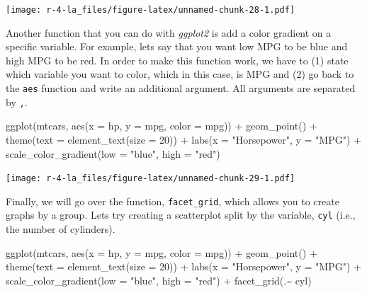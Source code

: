 \documentclass[
]{book}
\newenvironment{Shaded}{\begin{snugshade}}{\end{snugshade}}
\newcommand{\AttributeTok}[1]{\textcolor[rgb]{0.77,0.63,0.00}{#1}}
\newcommand{\DecValTok}[1]{\textcolor[rgb]{0.00,0.00,0.81}{#1}}
\newcommand{\FunctionTok}[1]{\textcolor[rgb]{0.00,0.00,0.00}{#1}}
\newcommand{\NormalTok}[1]{#1}
\newcommand{\SpecialCharTok}[1]{\textcolor[rgb]{0.00,0.00,0.00}{#1}}
\newcommand{\StringTok}[1]{\textcolor[rgb]{0.31,0.60,0.02}{#1}}
\begin{document}
\texttt{[image: r-4-la\_files/figure-latex/unnamed-chunk-28-1.pdf]}

Another function that you can do with \emph{ggplot2} is add a color gradient on a specific variable. For example, lets say that you want low MPG to be blue and high MPG to be red. In order to make this function work, we have to (1) state which variable you want to color, which in this case, is MPG and (2) go back to the \texttt{aes} function and write an additional argument. All arguments are separated by \texttt{,}.

\begin{Shaded}
\begin{Highlighting}[]
\FunctionTok{ggplot}\NormalTok{(mtcars, }\FunctionTok{aes}\NormalTok{(}\AttributeTok{x =}\NormalTok{ hp, }\AttributeTok{y =}\NormalTok{ mpg, }\AttributeTok{color =}\NormalTok{ mpg)) }\SpecialCharTok{+} 
      \FunctionTok{geom\_point}\NormalTok{() }\SpecialCharTok{+} 
      \FunctionTok{theme}\NormalTok{(}\AttributeTok{text =} \FunctionTok{element\_text}\NormalTok{(}\AttributeTok{size =} \DecValTok{20}\NormalTok{)) }\SpecialCharTok{+} 
      \FunctionTok{labs}\NormalTok{(}\AttributeTok{x =} \StringTok{"Horsepower"}\NormalTok{, }\AttributeTok{y =} \StringTok{"MPG"}\NormalTok{) }\SpecialCharTok{+} 
      \FunctionTok{scale\_color\_gradient}\NormalTok{(}\AttributeTok{low =} \StringTok{"blue"}\NormalTok{, }\AttributeTok{high =} \StringTok{"red"}\NormalTok{)}
\end{Highlighting}
\end{Shaded}

\texttt{[image: r-4-la\_files/figure-latex/unnamed-chunk-29-1.pdf]}

Finally, we will go over the function, \texttt{facet\_grid}, which allows you to create graphs by a group. Lets try creating a scatterplot split by the variable, \texttt{cyl} (i.e., the number of cylinders).

\begin{Shaded}
\begin{Highlighting}[]
\FunctionTok{ggplot}\NormalTok{(mtcars, }\FunctionTok{aes}\NormalTok{(}\AttributeTok{x =}\NormalTok{ hp, }\AttributeTok{y =}\NormalTok{ mpg, }\AttributeTok{color =}\NormalTok{ mpg)) }\SpecialCharTok{+} 
      \FunctionTok{geom\_point}\NormalTok{() }\SpecialCharTok{+} 
      \FunctionTok{theme}\NormalTok{(}\AttributeTok{text =} \FunctionTok{element\_text}\NormalTok{(}\AttributeTok{size =} \DecValTok{20}\NormalTok{)) }\SpecialCharTok{+} 
      \FunctionTok{labs}\NormalTok{(}\AttributeTok{x =} \StringTok{"Horsepower"}\NormalTok{, }\AttributeTok{y =} \StringTok{"MPG"}\NormalTok{) }\SpecialCharTok{+} 
      \FunctionTok{scale\_color\_gradient}\NormalTok{(}\AttributeTok{low =} \StringTok{"blue"}\NormalTok{, }\AttributeTok{high =} \StringTok{"red"}\NormalTok{) }\SpecialCharTok{+} 
      \FunctionTok{facet\_grid}\NormalTok{(.}\SpecialCharTok{\textasciitilde{}}\NormalTok{ cyl)}
\end{Highlighting}
\end{Shaded}
\end{document}

